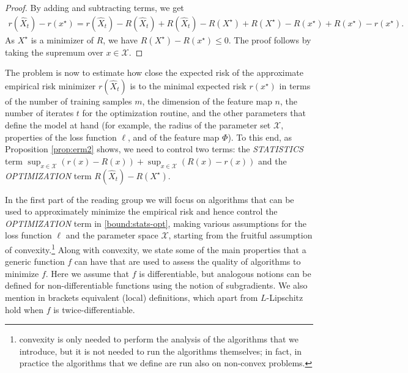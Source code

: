 \begin{proof}
By adding and subtracting terms, we get
\begin{align*}
	r(\hat X_t) - r(x^\star)
	= r(\hat X_t) - R(\hat X_t) + R(\hat X_t) - R(X^\star) + R(X^\star) - R(x^\star) + R(x^\star) - r(x^\star).
\end{align*}
As $X^\star$ is a minimizer of $R$, we have $R(X^\star) - R(x^\star) \le 0$. The proof follows by taking the supremum over $x\in\mathcal{X}$.
\end{proof}

The problem is now to estimate how close the expected risk of the approximate empirical risk minimizer $r(\hat X_t)$ is to the minimal expected risk $r(x^\star)$ in terms of the number of training samples $m$, the dimension of the feature map $n$, the number of iterates $t$ for the optimization routine, and the other parameters that define the model at hand (for example, the radius of the parameter set $\mathcal{X}$, properties of the loss function $\ell$, and of the feature map $\Phi$).
To this end, as Proposition \ref{prop:erm2} shows, we need to control two terms: the \emph{STATISTICS} term $\sup_{x\in\mathcal{X}} ( r(x) - R(x) ) + \sup_{x\in\mathcal{X}} ( R(x) - r(x) )$ and the \emph{OPTIMIZATION} term $R(\hat X_t) - R(X^\star)$.

In the first part of the reading group we will focus on algorithms that can be used to approximately minimize the empirical risk and hence control the \emph{OPTIMIZATION} term in \eqref{bound:stats-opt}, making various assumptions for the loss function $\ell$ and the parameter space $\mathcal{X}$, starting from the fruitful assumption of convexity.\footnote{convexity is only needed to perform the analysis of the algorithms that we introduce, but it is not needed to run the algorithms themselves; in fact, in practice the algorithms that we define are run also on non-convex problems.} Along with convexity, we state some of the main properties that a generic function $f$ can have that are used to assess the quality of algorithms to minimize $f$. Here we assume that $f$ is differentiable, but analogous notions can be defined for non-differentiable functions using the notion of subgradients. We also mention in brackets equivalent (local) definitions, which apart from $L$-Lipschitz hold when $f$ is twice-differentiable.


